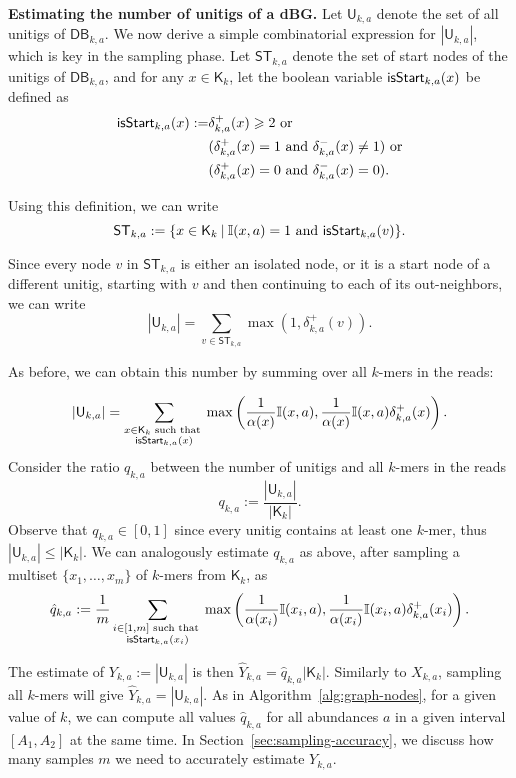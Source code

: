 \documentclass[a4paper,11pt]{article}
\newcommand{\DB}{\mathsf{DB}_{k,a}}
\newcommand{\U}{\mathsf{U}_{k,a}}
\newcommand{\ST}{\mathsf{ST}_{k,a}}
\newcommand{\dplus}{\delta^+_{k,a}}
\newcommand{\dminus}{\delta^-_{k,a}}
\newcommand{\K}{\mathsf{K}}
\newcommand{\abu}{\alpha}
\newcommand{\isstart}{{\sf isStart}_{k,a}}
\newcommand{\st}{\:|\:}
\renewcommand{\geq}{\geqslant}
\renewcommand{\leq}{\leqslant}
\begin{document}
\medskip
\noindent \textbf{Estimating the number of unitigs of a dBG.} Let $\U$ denote the set of all unitigs of $\DB$. We now derive a simple combinatorial expression for $|\U|$, which is key in the sampling phase. Let $\ST$ denote the set of start nodes of the unitigs of $\DB$, and for any $x \in \K_k$, let the boolean variable $\isstart(x)$ be defined as 
\begin{align*}
\isstart(x) := & \dplus(x) \geq 2 \text{ or } \\
& (\dplus(x) = 1 \text{ and } \dminus(x) \neq 1) \text{ or} \\
& (\dplus(x) = 0 \text{ and } \dminus(x) = 0).
\end{align*}

Using this definition, we can write 
\[\ST := \{x \in \K_k \st \mathbb{I}(x,a) = 1  \text{ and } \isstart(v)\}.\]

Since every node $v$ in $\ST$ is either an isolated node, or it is a start node of a different unitig, starting with $v$ and then continuing to each of its out-neighbors, we can write
\[|\U| = \sum_{v \in \ST} \max(1,\dplus(v)).\]

As before, we can obtain this number by summing over all $k$-mers in the reads:

\begin{equation}
|\U| = \sum_{\begin{subarray}{c} x \in \K_k \text{ such that } \\ \isstart(x) \end{subarray} } \max\left(\frac{1}{\abu(x)}\mathbb{I}(x,a),\frac{1}{\abu(x)}\mathbb{I}(x,a)\dplus(x)\right).
\label{eqn:number-of-unitigs}
\end{equation}
Consider the ratio $q_{k,a}$ between the number of unitigs and all $k$-mers in the reads 
\[q_{k,a} := \frac{|\U|}{|\K_k|}.\]
Observe that $q_{k,a} \in [0,1]$ since every unitig contains at least one $k$-mer, thus $|\U| \leq |\K_k|$. We can analogously estimate $q_{k,a}$ as above, after sampling a multiset $\{x_1,\dots,x_m\}$ of $k$-mers from $\K_k$, as
\[\hat{q}_{k,a} := \frac{1}{m}\displaystyle\sum_{\begin{subarray}{c}i \in [1,m] \text{ such that } \\ \isstart(x_i)\end{subarray}} \max\left(\frac{1}{\abu(x_i)}\mathbb{I}(x_i,a),\frac{1}{\abu(x_i)}\mathbb{I}(x_i,a)\dplus(x_i)\right).\]

The estimate of $Y_{k,a} := |\U|$ is then $\hat{Y}_{k,a} = \hat{q}_{k,a}|\K_k|$. Similarly to $X_{k,a}$, sampling all $k$-mers will give $\hat{Y}_{k,a} = |\U|$. As in Algorithm~\ref{alg:graph-nodes}, for a given value of $k$, we can compute all values $\hat{q}_{k,a}$ for all abundances $a$ in a given interval $[A_1,A_2]$ at the same time. In Section~\ref{sec:sampling-accuracy}, we discuss how many samples $m$ we need to accurately estimate $Y_{k,a}$.
\end{document}
